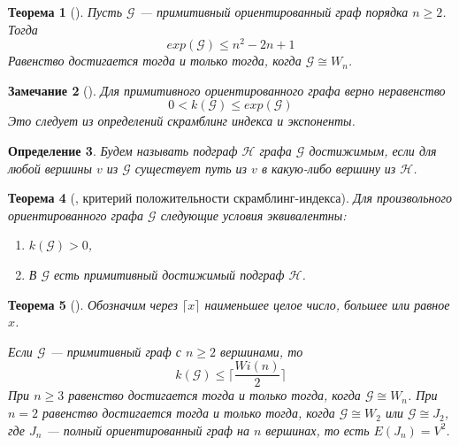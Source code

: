\documentclass[12pt]{article}
\newtheorem{theorem}{Теорема}[section]
\newtheorem{definition}[theorem]{Определение}
\newtheorem{remark}[theorem]{Замечание}
\begin{document}
\begin{theorem} [\cite{scramblingIndex}]
Пусть $\mathcal{G}$ --- примитивный ориентированный граф порядка $n \ge 2$. Тогда \begin{equation*}
    exp(\mathcal{G}) \le n^2 - 2n + 1
\end{equation*}
Равенство достигается тогда и только тогда, когда $\mathcal{G} \cong W_n$.
\end{theorem}

\begin{remark}[\cite{scramblingIndex}]
Для примитивного ориентированного графа верно неравенство \begin{equation*}
    0 < k(\mathcal{G}) \le exp(\mathcal{G})
\end{equation*}
Это следует из определений скрамблинг индекса и экспоненты.
\end{remark}

\begin{definition}
Будем называть подграф $\mathcal{H}$ графа $\mathcal{G}$ достижимым, если для любой вершины $v$ из $\mathcal{G}$ существует путь из $v$ в какую-либо вершину из $\mathcal{H}$.
\end{definition}

\begin{theorem} [\cite{scramblingIndex}, критерий положительности скрамблинг-индекса]
\label{theorem:ScramblingIndexCriteria}
Для произвольного ориентированного графа $\mathcal{G}$ следующие условия эквивалентны:
\begin{enumerate}
\item $k(\mathcal{G}) > 0$,
\item В $\mathcal{G}$ есть примитивный достижимый подграф $\mathcal{H}$.
\end{enumerate}
\end{theorem}

\begin{theorem} [\cite{scramblingIndex}]
Обозначим через $\lceil x \rceil$ наименьшее целое число, большее или равное $x$.

Если $\mathcal{G}$ --- примитивный граф с $n \ge 2 $ вершинами, то \begin{equation*}
    k(\mathcal{G}) \le \bigg \lceil \frac{Wi(n)}{2} \bigg \rceil
\end{equation*}
При $n \ge 3$ равенство достигается тогда и только тогда, когда $\mathcal{G} \cong W_n$. При $n = 2$ равенство достигается тогда и только тогда, когда $\mathcal{G} \cong W_2$ или $\mathcal{G} \cong J_2$, где $J_n$ --- полный ориентированный граф на $n$ вершинах, то есть $E(J_n) = V^2$.
\end{theorem}
\end{document}
